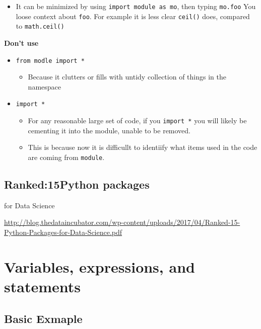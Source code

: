 \documentclass[]{book}
\providecommand{\tightlist}{%
  \setlength{\itemsep}{0pt}\setlength{\parskip}{0pt}}
\begin{document}
\begin{itemize}
\tightlist
\item
  It can be minimized by using \texttt{import\ module\ as\ mo}, then typing \texttt{mo.foo} \textbar{} You loose context about \texttt{foo}. For example it is less clear \texttt{ceil()} does, compared to \texttt{math.ceil()}
\end{itemize}

\textbf{Don't use}

\begin{itemize}
\item
  \texttt{from\ modle\ import\ *}

  \begin{itemize}
  \tightlist
  \item
    Because it clutters or fills with untidy collection of things in the namespace
  \end{itemize}
\item
  \texttt{import\ *}

  \begin{itemize}
  \item
    For any reasonable large set of code, if you \texttt{import\ *} you will likely be cementing it into the module, unable to be removed.
  \item
    This is because now it is difficullt to identiify what items used in the code are coming from \texttt{module}.
  \end{itemize}
\end{itemize}

\hypertarget{ranked15python-packages}{%
\section{Ranked:15Python packages}\label{ranked15python-packages}}

for Data Science

\url{http://blog.thedataincubator.com/wp-content/uploads/2017/04/Ranked-15-Python-Packages-for-Data-Science.pdf}

\hypertarget{variables-expressions-and-statements}{%
\chapter{Variables, expressions, and statements}\label{variables-expressions-and-statements}}

\hypertarget{basic-exmaple}{%
\section{Basic Exmaple}\label{basic-exmaple}}
\end{document}
